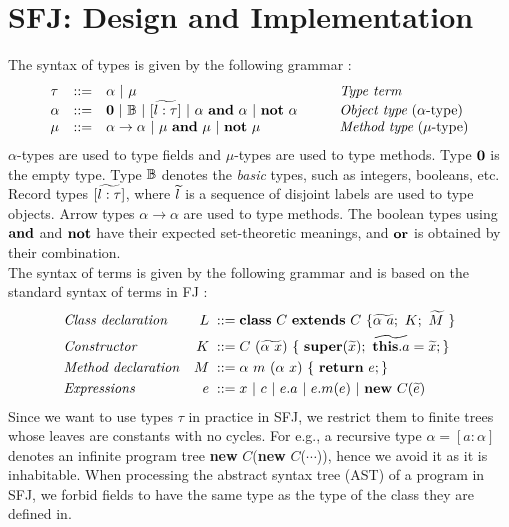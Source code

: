 \documentclass[runningheads]{llncs}
\begin{document}
\section{SFJ: Design and Implementation}
\label{sec:design}
The syntax of types is given by the following grammar \cite{Dardha2013,Dardha2017}:
$$
\begin{array}{llll}
\tau & ::= & \alpha \ |\ \mu
& \mbox{{\em Type term}}
\\
\alpha & ::=  & \zero \ |\ \btypes \ |\ [\wt{l:\tau}] \ |\ \alpha \ \bf{and}\ \alpha \ |\ \bf{not}\ \alpha
\qquad
& \mbox{{\em Object type} ($\alpha $-type)}
\\
\mu & ::=  & \alpha \to \alpha \ |\ \mu \ \bf{and}\ \mu \ |\ \bf{not}\ \mu
& \mbox{{\em Method type} ($\mu $-type)}
\end{array}
$$
$\alpha$-types are used to type fields and $\mu$-types are used to type methods.
Type $\mathbf{0}$ is the empty type.
Type ${\mathbb B}$ denotes the \emph{basic} types, such as integers, booleans, etc.
{Record} types $[\widetilde{l:\tau}]$, where $\widetilde{l}$ is a sequence of disjoint labels are used to type objects.
Arrow types $\alpha \to \alpha$ are used to type methods.
The boolean types using $\bf{and}$ and $\bf{not}$ have their expected set-theoretic meanings, and $\bf{or}$ is obtained by their combination.\\
The syntax of terms is given by the following grammar and is based on the standard syntax of terms in FJ \cite{featherweight,Dardha2013,Dardha2017}:
\begin{align*}
& \mbox{\textit{Class declaration}} & L \; ::= \; & \syndecl{C}{C}{\wt{\alpha \ a};\ K; \ \wt{M}\ }\\
& \mbox{\textit{Constructor}} & K \;::=\; & C\ (\wt{\alpha\ x})\ \{\ \synsuper(\wt{x});\ \wt{\synthis.a}=\wt{x}; \}\\
& \mbox{\textit{Method declaration}} & M \; ::= \; & \alpha \ m\ (\alpha \ x)\ \{\ \synret e; \} \\
& \mbox{\textit{Expressions}} & e \; ::=\; & x\ |\  c\ |\ e.a\ |\ e.m(e) \ | \ \synnew C(\wt{e})
\end{align*}
Since we want to use types $\tau$ in practice in SFJ, we restrict them to finite trees whose leaves are constants with no cycles.
For e.g., a recursive type $\alpha = [a : \alpha]$ denotes an infinite program tree \textbf{new} $C$(\textbf{new} $C$($\cdots{}$)), hence we avoid it as it is inhabitable.
When processing the abstract syntax tree (AST) of a program in SFJ, we forbid fields to have the same type as the type of the class they are defined in. 
\end{document}
